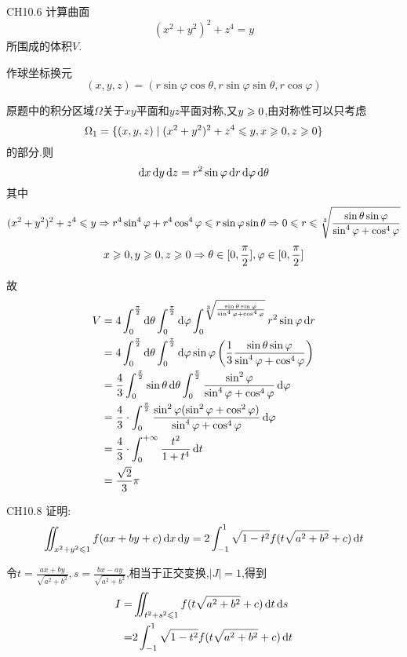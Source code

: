 \begin{exercise}
    {CH10.6}
    计算曲面$$
    (x^2 + y^2)^2 + z^4 = y
    $$所围成的体积$V$.
\end{exercise}

\begin{solution}
    作球坐标换元$$(x,y,z)=(r\sin \varphi \cos \theta,r\sin \varphi \sin \theta,r\cos \varphi)$$

    原题中的积分区域$\Omega$关于$xy$平面和$yz$平面对称,又$y \geqslant 0 $,由对称性可以只考虑
    $$\Omega_1 = \{ (x,y,z) \mid (x^2+y^2)^2+z^4 \leqslant y, x \geqslant 0, z \geqslant 0 \}$$
    的部分.则$$\operatorname{d\!} x \operatorname{d\!} y \operatorname{d\!} z = r^2 \sin \varphi \operatorname{d\!} r \operatorname{d\!} \varphi \operatorname{d\!} \theta$$其中
    $$(x^2+y^2)^2+z^4 \leqslant y \Rightarrow r^4 \sin^4 \varphi + r^4 \cos^4 \varphi \leqslant r \sin \varphi \sin \theta \Rightarrow 0 \leqslant r \leqslant \sqrt[3]{\frac{ \sin \theta \sin \varphi}{\sin^4 \varphi + \cos^4 \varphi}}$$
    $$x \geqslant 0 , y \geqslant 0 , z \geqslant 0 \Rightarrow \theta \in [0,\frac{\pi}{2}], \varphi \in [0,\frac{\pi}{2}]$$

    故
    \begin{align*}
        V &= 4\int_0^{\frac{\pi}{2}} \dif \theta \int_0^{\frac{\pi}{2}} \dif \varphi \int_0^{\sqrt[3]{\frac{ \sin \theta \sin \varphi}{\sin^4 \varphi + \cos^4 \varphi}}} r^2 \sin \varphi \dif r \\
        &=4\int_0^{\frac{\pi}{2}} \dif \theta \int_0^{\frac{\pi}{2}} \dif \varphi  \sin \varphi \left( \frac13 \frac{\sin \theta \sin \varphi}{\sin^4 \varphi + \cos^4 \varphi} \right) \\
        &=\frac43 \int_0^{\frac{\pi}{2}} \sin \theta \dif \theta \int_0^{\frac{\pi}{2}} \frac{\sin^2 \varphi}{\sin^4 \varphi + \cos^4 \varphi} \dif \varphi \\
        &=\frac43 \cdot \int_0^{\frac{\pi}{2}} \frac{\sin^2 \varphi(\sin^2 \varphi + \cos^2 \varphi)}{\sin^4 \varphi + \cos^4 \varphi} \dif \varphi \\
        &=\frac43 \cdot \int_0^{+\infty} \frac{t^2}{1+ t^4} \dif t \\
        &=\frac{\sqrt 2}{3} \pi
    \end{align*}
\end{solution}



\begin{exercise}{CH10.8}
    证明:$$\iint_{x^2+y^2\leqslant 1}f(ax+by+c)\operatorname{d\!} x \operatorname{d\!} y=2\int_{-1}^{1}\sqrt{1-t^2}f(t\sqrt{a^2+b^2}+c)\operatorname{d\!} t$$
\end{exercise}
\begin{solution}
    令$t=\frac{ax+by}{\sqrt{a^2+b^2}},s=\frac{bx-ay}{\sqrt{a^2+b^2}}$,相当于正交变换,$|J|=1$,得到
    \begin{align*}
        I=&\iint_{t^2+s^2\leqslant 1}f(t\sqrt{a^2+b^2}+c)\operatorname{d\!} t \operatorname{d\!} s\\
        =&2\int_{-1}^{1}\sqrt{1-t^2}f(t\sqrt{a^2+b^2}+c)\operatorname{d\!} t
    \end{align*}
\end{solution}


